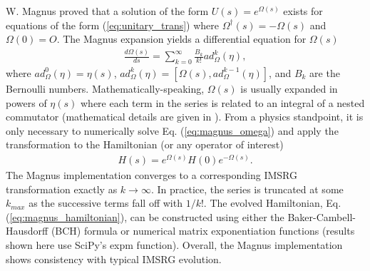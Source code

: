 \documentclass[preprintnumbers,floatfix,aps,prc,preprint]{revtex4-1}
\begin{document}
W. Magnus proved that a solution of the form $U(s)=e^{\Omega(s)}$ exists for equations of the form (\ref{eq:unitary_trans}) where $\Omega^{\dagger}(s)=-\Omega(s)$ and $\Omega(0)=O$. The Magnus expansion yields a differential equation for $\Omega(s)$
%
\begin{eqnarray}
\label{eq:magnus_omega}
\frac{d\Omega(s)}{ds} = \sum_{k=0}^{\infty} \frac{B_k}{k!} ad_{\Omega}^{k}(\eta),
\end{eqnarray}
%
where $ad_{\Omega}^{0}(\eta)=\eta(s)$, $ad_{\Omega}^{k}(\eta)=[\Omega(s),ad_{\Omega}^{k-1}(\eta)]$, and $B_k$ are the Bernoulli numbers.
%
Mathematically-speaking, $\Omega(s)$ is usually expanded in powers of $\eta(s)$ where each term in the series is related to an integral of a nested commutator (mathematical details are given in \cite{Magnus:1954,Blanes:2009}). From a physics standpoint, it is only necessary to numerically solve Eq. (\ref{eq:magnus_omega}) and apply the transformation to the Hamiltonian (or any operator of interest)
%
\begin{eqnarray}
\label{eq:magnus_hamiltonian}
H(s) = e^{\Omega(s)} H(0) e^{-\Omega(s)}.
\end{eqnarray}
%
The Magnus implementation converges to a corresponding IMSRG transformation exactly as $k \rightarrow \infty$. In practice, the series is truncated at some $k_{max}$ as the successive terms fall off with $1/k!$. The evolved Hamiltonian, Eq. (\ref{eq:magnus_hamiltonian}), can be constructed using either the Baker-Cambell-Hausdorff (BCH) formula or numerical matrix exponentiation functions (results shown here use SciPy's expm function). Overall, the Magnus implementation shows consistency with typical IMSRG evolution. \\
\end{document}
